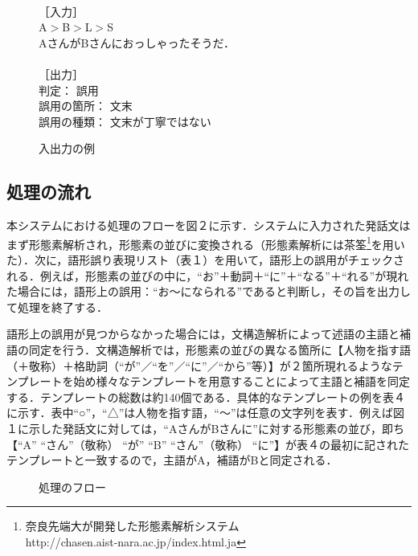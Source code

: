 \begin{figure}[htbp]
\begin{center}
\fbox
{
\begin{minipage}{60mm}
\baselineskip=4mm
　\\
［入力］\\ 
A$>$B$>$L$>$S\\
AさんがBさんにおっしゃったそうだ．\\
\\
［出力］\\
判定： $誤用$\\
誤用の箇所： $文末$\\
誤用の種類： $文末が丁寧ではない$\\
\end{minipage}
}
\caption{入出力の例}
\label{fig:figure1}
\end{center}
\end{figure}


\subsection{処理の流れ}
本システムにおける処理のフローを図２に示す．システムに入力された発話文はまず形態素解析され，形態素の並びに変換される（形態素解析には茶筌\footnote{奈良先端大が開発した形態素解析システム\\http://chasen.aist-nara.ac.jp/index.html.ja}を用いた）．次に，語形誤り表現リスト（表１）を用いて，語形上の誤用がチェックされる．例えば，形態素の並びの中に，\mbox{``お''}＋動詞＋``に''＋``なる''＋``れる''が現れた場合には，語形上の誤用：``お〜になられる''であると判断し，その旨を出力して処理を終了する．

語形上の誤用が見つからなかった場合には，文構造解析によって述語の主語と補語の同定を行う．文構造解析では，形態素の並びの異なる箇所に【人物を指す語（＋敬称）＋格助詞（``が''／``を''／``に''／``から''等）】が２箇所現れるようなテンプレートを始め様々なテンプレートを用意することによって主語と補語を同定する．テンプレートの総数は約140個である．具体的なテンプレートの例を表４に示す．表中``○''，``△''は人物を指す語，``〜''は任意の文字列を表す．例えば図１に示した発話文に対しては，``AさんがBさんに''に対する形態素の並び，即ち【``A'' ``さん''（敬称） ``が'' ``B'' ``さん''（敬称） ``に''】が表４の最初に記されたテンプレートと一致するので，主語がA，補語がBと同定される．

\begin{figure}[htbp]
\begin{center}
\epsfxsize=11cm  
\caption{処理のフロー}
\label{fig:figure2}
\end{center}
\end{figure}


